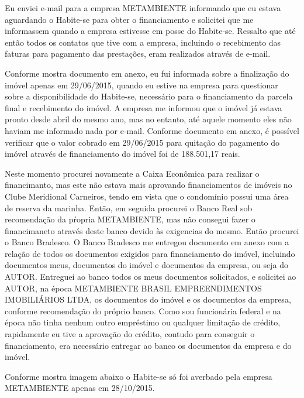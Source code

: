 \documentclass[11pt]{letter}
\begin{document}
Eu enviei e-mail para a empresa METAMBIENTE informando que eu estava aguardando o Habite-se para obter o financiamento e solicitei que me informassem quando a empresa estivesse em posse do Habite-se. Ressalto que até então todos os contatos que tive com a empresa, incluindo o recebimento das faturas para pagamento das prestações, eram realizados através de e-mail.

Conforme mostra documento em anexo, eu fui informada sobre a finalização do imóvel apenas em 29/06/2015, quando eu estive na empresa para questionar sobre a disponibilidade do Habite-se, necessário para o financiamento da parcela final e recebimento do imóvel. A empresa me informou que o imóvel já estava pronto desde abril do mesmo ano, mas no entanto, até aquele momento eles não haviam me informado nada por e-mail. Conforme documento em anexo, é possível verificar que o valor cobrado em 29/06/2015 para quitação do pagamento do imóvel através de financiamento do imóvel foi de 188.501,17 reais.

Neste momento procurei novamente a Caixa Econômica para realizar o financimanto, mas este não estava mais aprovando financiamentos de imóveis no Clube Meridional Carneiros, tendo em vista que o condomínio possui uma área de reserva da marinha. Então, em seguida procurei o Banco Real sob recomendação da pŕopria METAMBIENTE, mas não consegui fazer o financimaneto através deste banco devido às exigencias do mesmo. Então procurei o Banco Bradesco. O Banco Bradesco me entregou documento em anexo com a relação de todos os documentos exigidos para financiamento do imóvel, incluindo documentos meus, documentos do imóvel e documentos da empresa, ou seja do AUTOR. Entreguei ao banco todos os meus documentos solicitados, e solicitei ao AUTOR, na época METAMBIENTE BRASIL EMPREENDIMENTOS IMOBILIÁRIOS LTDA, os documentos do imóvel e os documentos da empresa, conforme recomendação do próprio banco. Como sou funcionária federal e na época não tinha nenhum outro empréstimo ou qualquer limitação de crédito, rapidamente eu tive a aprovação do crédito, contudo para conseguir o financiamento, era necessário entregar ao banco os documentos da empresa e do imóvel.

Conforme mostra imagem abaixo o Habite-se só foi averbado pela empresa METAMBIENTE apenas em 28/10/2015.
\end{document}
